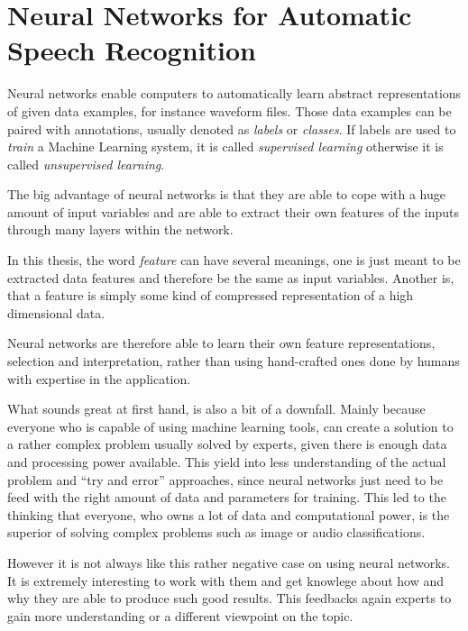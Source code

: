 
\section{Neural Networks for Automatic Speech Recognition}\label{sec:intro_nn}

Neural networks enable computers to automatically learn abstract representations of given data examples, for instance waveform files.
Those data examples can be paired with annotations, usually denoted as \emph{labels} or \emph{classes}.
If labels are used to \emph{train} a Machine Learning system, it is called \emph{supervised learning} otherwise it is called \emph{unsupervised learning}.

The big advantage of neural networks is that they are able to cope with a huge amount of input variables and are able to extract their own features of the inputs through many layers within the network.

In this thesis, the word \emph{feature} can have several meanings, one is just meant to be extracted data features and therefore be the same as input variables. 
Another is, that a feature is simply some kind of compressed representation of a high dimensional data.

Neural networks are therefore able to learn their own feature representations, selection and interpretation, rather than using hand-crafted ones done by humans with expertise in the application. 

What sounds great at first hand, is also a bit of a downfall.
Mainly because everyone who is capable of using machine learning tools, can create a solution to a rather complex problem usually solved by experts, given there is enough data and processing power available.
This yield into less understanding of the actual problem and \enquote{try and error} approaches, since neural networks just need to be feed with the right amount of data and parameters for training.
This led to the thinking that everyone, who owns a lot of data and computational power, is the superior of solving complex problems such as image or audio classifications.

However it is not always like this rather negative case on using neural networks. 
It is extremely interesting to work with them and get knowlege about how and why they are able to produce such good results.
This feedbacks again experts to gain more understanding or a different viewpoint on the topic.
